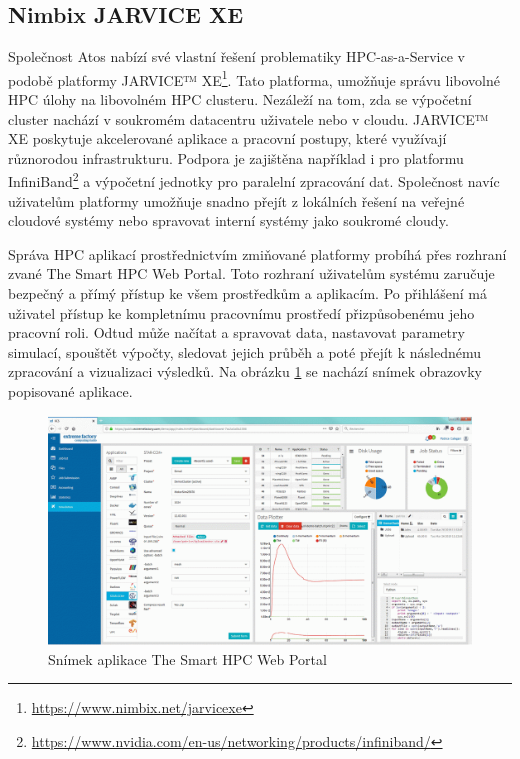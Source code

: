 \subsection{Nimbix JARVICE XE}
Společnost Atos nabízí své vlastní řešení problematiky HPC-as-a-Service v podobě platformy JARVICE™ XE\footnote{\href{https://www.nimbix.net/jarvicexe}{https://www.nimbix.net/jarvicexe}}. Tato platforma, umožňuje správu libovolné HPC úlohy na libovolném HPC clusteru. Nezáleží na tom, zda se výpočetní cluster nachází v soukromém datacentru uživatele nebo v cloudu. JARVICE™ XE poskytuje akcelerované aplikace a pracovní postupy, které využívají různorodou infrastrukturu. Podpora je zajištěna například i pro platformu InfiniBand\footnote{\href{https://www.nvidia.com/en-us/networking/products/infiniband/}{https://www.nvidia.com/en-us/networking/products/infiniband/}} a výpočetní jednotky pro paralelní zpracování dat. Společnost navíc uživatelům platformy umožňuje snadno přejít z lokálních řešení na veřejné cloudové systémy nebo spravovat interní systémy jako soukromé cloudy. 

Správa HPC aplikací prostřednictvím zmiňované platformy probíhá přes rozhraní zvané The Smart HPC Web Portal. Toto rozhraní uživatelům systému zaručuje bezpečný a přímý přístup ke všem prostředkům a aplikacím. Po přihlášení má uživatel přístup ke kompletnímu pracovnímu prostředí přizpůsobenému jeho pracovní roli. Odtud může načítat a spravovat data, nastavovat parametry simulací, spouštět výpočty, sledovat jejich průběh a poté přejít k následnému zpracování a vizualizaci výsledků. Na obrázku \ref{fig:atos-dashboard} se nachází snímek obrazovky popisované aplikace.





\begin{figure}[!h]
	\centering
	\includegraphics[width=1\textwidth]{Figures/atos-dashboard.png}
	\caption{Snímek aplikace The Smart HPC Web Portal \cite{l9RorNxGDyQGAn8I}}
	\label{fig:atos-dashboard}
\end{figure}

